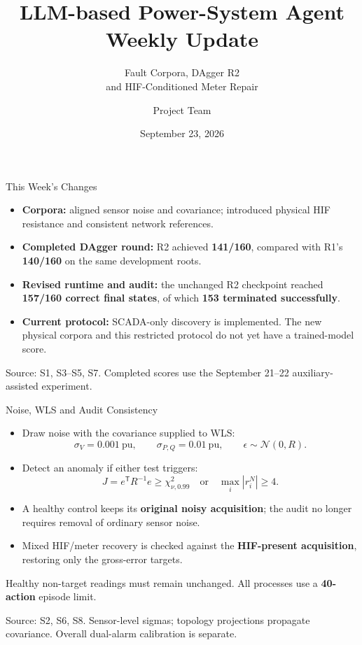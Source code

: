 \documentclass{beamer}
\title{LLM-based Power-System Agent\\Weekly Update}
\subtitle{Fault Corpora, DAgger R2\\and HIF-Conditioned Meter Repair}
\author{Project Team}
\date{September 23, 2026}
\newcommand{\src}[1]{\par\vfill\begin{minipage}{0.67\textwidth}\tiny\color{gray}Source: #1.\end{minipage}\par}
\begin{document}
\frame{\titlepage}

\begin{frame}{This Week's Changes}
  \begin{itemize}
    \setlength\itemsep{0.7em}
    \item \textbf{Corpora:} aligned sensor noise and covariance; introduced physical HIF resistance and consistent network references.
    \item \textbf{Completed DAgger round:} R2 achieved \textbf{141/160}, compared with R1's \textbf{140/160} on the same development roots.
    \item \textbf{Revised runtime and audit:} the unchanged R2 checkpoint reached \textbf{157/160 correct final states}, of which \textbf{153 terminated successfully}.
    \item \textbf{Current protocol:} SCADA-only discovery is implemented. The new physical corpora and this restricted protocol do not yet have a trained-model score.
  \end{itemize}
  \src{S1, S3--S5, S7. Completed scores use the September 21--22 auxiliary-assisted experiment}
\end{frame}

\begin{frame}{Noise, WLS and Audit Consistency}
  \begin{itemize}
    \item Draw noise with the covariance supplied to WLS:
      \[\sigma_V=0.001\ \mathrm{pu},\qquad \sigma_{P,Q}=0.01\ \mathrm{pu},\qquad
        \epsilon\sim\mathcal N(0,R).\]
    \item Detect an anomaly if either test triggers:
      \[J=e^\mathsf{T}R^{-1}e\geq\chi^2_{\nu,0.99}
        \quad\text{or}\quad \max_i |r_i^N|\geq4.\]
    \item A healthy control keeps its \textbf{original noisy acquisition}; the audit no longer requires removal of ordinary sensor noise.
    \item Mixed HIF/meter recovery is checked against the \textbf{HIF-present acquisition}, restoring only the gross-error targets.
  \end{itemize}
  \small Healthy non-target readings must remain unchanged. All processes use a \textbf{40-action} episode limit.
  \src{S2, S6, S8. Sensor-level sigmas; topology projections propagate covariance. Overall dual-alarm calibration is separate}
\end{frame}
\end{document}

